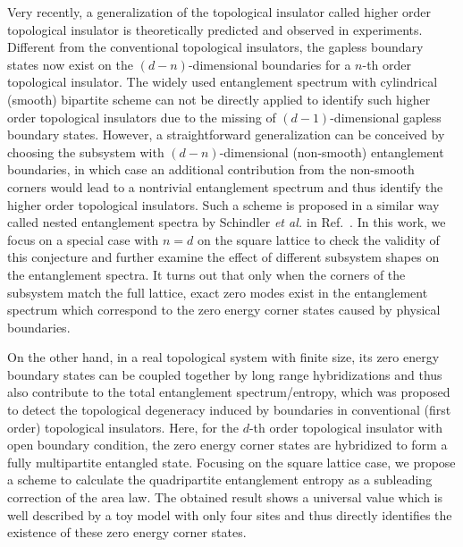 \documentclass[twocolumn,superscriptaddress]{revtex4-1}
\newcommand{\etal}{\textit{et al.{ }}}
\begin{document}
Very recently, a generalization of the topological insulator called higher order topological insulator is theoretically predicted and observed in experiments. \cite{Benalcazar_S_2017, Benalcazar_PRB_2017, Schindler_SA_2018, Song_PRL_2017, Parameswaran_P_2017, Xu_a_2017, Ezawa_PRL_2018, Ezawa_PRB_2018, Kunst_PRB_2018, Schindler_a_2018} Different from the conventional topological insulators, the gapless boundary states now exist on the $(d-n)$-dimensional boundaries for a $n$-th order topological insulator. The widely used entanglement spectrum with cylindrical (smooth) bipartite scheme can not be directly applied to identify such higher order topological insulators due to the missing of $(d-1)$-dimensional gapless boundary states. However, a straightforward generalization can be conceived by choosing the subsystem with $(d-n)$-dimensional (non-smooth) entanglement boundaries, in which case an additional contribution from the non-smooth corners \cite{Laflorencie_PR_2016} would lead to a nontrivial entanglement spectrum and thus identify the higher order topological insulators. Such a scheme is proposed in a similar way called nested entanglement spectra by Schindler \etal in Ref.~. In this work, we focus on a special case with $n=d$ on the square lattice to check the validity of this conjecture and further examine the effect of different subsystem shapes on the entanglement spectra. It turns out that only when the corners of the subsystem match the full lattice, exact zero modes exist in the entanglement spectrum which correspond to the zero energy corner states caused by physical boundaries.

On the other hand, in a real topological system with finite size, its zero energy boundary states can be coupled together by long range hybridizations and thus also contribute to the total entanglement spectrum/entropy, which was proposed to detect the topological degeneracy induced by boundaries in conventional (first order) topological insulators. \cite{Wang_PRB_2015e} Here, for the $d$-th order topological insulator with open boundary condition, the zero energy corner states are hybridized to form a fully multipartite entangled state. Focusing on the square lattice case, we propose a scheme to calculate the quadripartite entanglement entropy as a subleading correction of the area law. The obtained result shows a universal value which is well described by a toy model with only four sites and thus directly identifies the existence of these zero energy corner states. 
\end{document}
